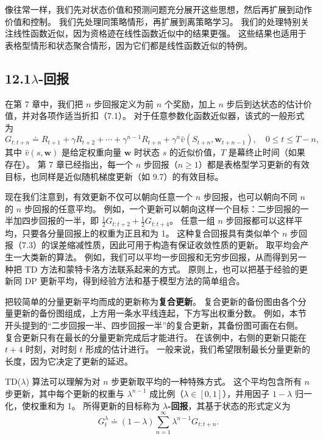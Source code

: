 \documentclass[UTF8, 12pt, fontset=fandol, oneside]{ctexart}
\begin{document}
像往常一样，我们先对状态价值和预测问题充分展开这些思想，然后再扩展到动作价值和控制。
我们先处理同策略情形，再扩展到离策略学习。
我们的处理特别关注线性函数近似，因为资格迹在线性函数近似中的结果更强。
这些结果也适用于表格型情形和状态聚合情形，因为它们都是线性函数近似的特例。

\subsection*{12.1\quad $\lambda$-回报}

在第 7 章中，我们把 $n$ 步回报定义为前 $n$ 个奖励，加上 $n$ 步后到达状态的估计价值，并对各项作适当折扣（7.1）。
对于任意参数化函数近似器，该式的一般形式为
\begin{equation}
G_{t:t+n}\doteq R_{t+1}+\gamma R_{t+2}+\cdots+\gamma^{n-1}R_{t+n}
+\gamma^n\hat v(S_{t+n},\mathbf{w}_{t+n-1}),\quad 0\le t\le T-n,
\tag{12.1}
\end{equation}
其中 $\hat v(s,\mathbf{w})$ 是给定权重向量 $\mathbf{w}$ 时状态 $s$ 的近似价值，$T$ 是幕终止时间（如果存在）。
第 7 章已经指出，每一个 $n$ 步回报（$n\ge 1$）都是表格型学习更新的有效目标，也同样是近似随机梯度更新（如 9.7）的有效目标。

现在我们注意到，有效更新不仅可以朝向任意一个 $n$ 步回报，也可以朝向不同 $n$ 的 $n$ 步回报的任意平均。
例如，一个更新可以朝向这样一个目标：二步回报的一半加四步回报的一半，即 $\frac12G_{t:t+2}+\frac12G_{t:t+4}$。
任意一组 $n$ 步回报都可以这样平均，只要各分量回报上的权重为正且和为 1。
这种复合回报具有类似单个 $n$ 步回报（7.3）的误差缩减性质，因此可用于构造有保证收敛性质的更新。
取平均会产生一大类新的算法。
例如，我们可以平均一步回报和无穷步回报，从而得到另一种把 TD 方法和蒙特卡洛方法联系起来的方式。
原则上，也可以把基于经验的更新同 DP 更新平均，得到经验方法和基于模型方法的简单组合。

把较简单的分量更新平均而成的更新称为\textbf{复合更新}。
复合更新的备份图由各个分量更新的备份图组成，上方用一条水平线连起，下方写出权重分数。
例如，本节开头提到的“二步回报一半、四步回报一半”的复合更新，其备份图可画在右侧。
复合更新只有在最长的分量更新完成后才能进行。
在该例中，右侧的更新只能在 $t+4$ 时刻，对时刻 $t$ 形成的估计进行。
一般来说，我们希望限制最长分量更新的长度，因为它决定了更新的延迟。

TD($\lambda$) 算法可以理解为对 $n$ 步更新取平均的一种特殊方式。
这个平均包含所有 $n$ 步更新，其中每个更新的权重与 $\lambda^{n-1}$ 成比例（$\lambda\in[0,1]$），并用因子 $1-\lambda$ 归一化，使权重和为 1。
所得更新的目标称为 \textbf{$\lambda$-回报}，其基于状态的形式定义为
\begin{equation}
G_t^\lambda\doteq (1-\lambda)\sum_{n=1}^{\infty}\lambda^{n-1}G_{t:t+n}.
\tag{12.2}
\end{equation}
\end{document}
